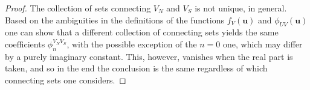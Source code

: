 \documentclass[11pt]{amsart}
\theoremstyle{remark}
\theoremstyle{remark}
\theoremstyle{definition}
\theoremstyle{definition}
\theoremstyle{definition}
\newcommand{\0}{{\scriptstyle 0'}} %
\newcommand{\1}{{\scriptstyle 1'}}
\begin{document}
\begin{proof}
The collection of sets connecting $V_N$ and $V_S$ is not unique, in general. Based on the ambiguities in the definitions of the functions $f_V(\mathbf{u})$ and $\phi_{UV}(\mathbf{u})$ one can show that a different collection of connecting sets yields the same coefficients $\phi^{V_NV_S}_n\!$, with the possible exception of the $n=0$ one, which may differ by a purely imaginary constant. This, however, vanishes when the real part is taken, and so in the end the conclusion is the same regardless of which connecting sets one considers.
\end{proof}


%
%
%
%
%
%
%
%
%
%
%
%
%
%
%
\end{document}
